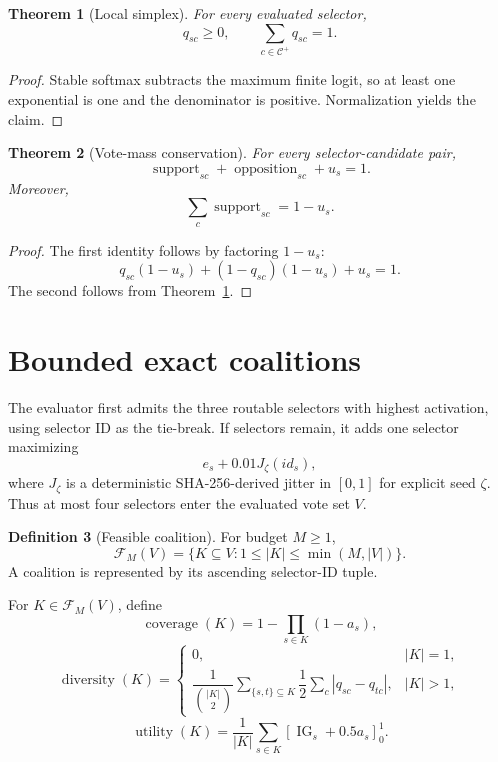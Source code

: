 \documentclass[11pt]{article}
\theoremstyle{definition}
\newtheorem{definition}{Definition}[section]
\theoremstyle{plain}
\newtheorem{theorem}[definition]{Theorem}
\newcommand{\clip}[3]{\left[#1\right]_{#2}^{#3}}
\begin{document}
\begin{theorem}[Local simplex]
\label{thm:local-simplex}
For every evaluated selector,
\[
q_{sc}\ge0,\qquad \sum_{c\in\mathcal C^+}q_{sc}=1.
\]
\end{theorem}

\begin{proof}
Stable softmax subtracts the maximum finite logit, so at least one
exponential is one and the denominator is positive.  Normalization yields the
claim.
\end{proof}

\begin{theorem}[Vote-mass conservation]
\label{thm:vote-mass}
For every selector-candidate pair,
\[
\operatorname{support}_{sc}
+\operatorname{opposition}_{sc}
+u_s=1.
\]
Moreover,
\[
\sum_c\operatorname{support}_{sc}=1-u_s.
\]
\end{theorem}

\begin{proof}
The first identity follows by factoring $1-u_s$:
\[
q_{sc}(1-u_s)+(1-q_{sc})(1-u_s)+u_s=1.
\]
The second follows from Theorem~\ref{thm:local-simplex}.
\end{proof}

\section{Bounded exact coalitions}

The evaluator first admits the three routable selectors with highest
activation, using selector ID as the tie-break.  If selectors remain, it adds
one selector maximizing
\[
 e_s+0.01J_\zeta(id_s),
\]
where $J_\zeta$ is a deterministic SHA-256-derived jitter in $[0,1]$ for
explicit seed $\zeta$.  Thus at most four selectors enter the evaluated vote
set $V$.

\begin{definition}[Feasible coalition]
For budget $M\ge1$,
\[
\mathcal F_M(V)=
\{K\subseteq V:1\le |K|\le\min(M,|V|)\}.
\]
A coalition is represented by its ascending selector-ID tuple.
\end{definition}

For $K\in\mathcal F_M(V)$, define
\[
\operatorname{coverage}(K)
=1-\prod_{s\in K}(1-a_s),
\]
\[
\operatorname{diversity}(K)=
\begin{cases}
0,&|K|=1,\\[1mm]
\dfrac{1}{\binom{|K|}{2}}
\displaystyle\sum_{\{s,t\}\subseteq K}
\dfrac12\sum_c|q_{sc}-q_{tc}|,&|K|>1,
\end{cases}
\]
\[
\operatorname{utility}(K)
=\frac1{|K|}\sum_{s\in K}
\clip{\operatorname{IG}_s+0.5a_s}{0}{1}.
\]
\end{document}
